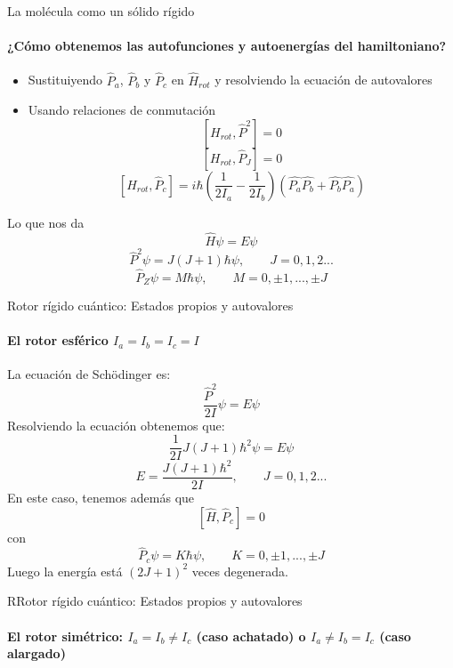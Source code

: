 \documentclass[a4paper]{beamer}
\begin{document}
\begin{frame}{La molécula como un sólido rígido}
\framesubtitle{¿Cómo obtenemos las autofunciones y autoenergías del hamiltoniano?}
\begin{itemize}
\item	Sustituiyendo $\hat P_a$, $\hat P_b$ y $\hat P_c$ en $\hat H_{rot}$ y resolviendo la ecuación de autovalores 
\item Usando relaciones de conmutación 
\begin{equation*}
\left[H_{rot}, \hat P^2 \right] = 0
\end{equation*}
\begin{equation*}
\left[H_{rot}, \hat P_J \right] = 0
\end{equation*}
\begin{equation*}
\left[H_{rot}, \hat P_c \right] = i\hbar \left(\frac{1}{2I_a}-\frac{1}{2I_b}\right)\left(\hat{P_a}\hat{P_b}+\hat{P_b}\hat{P_a}\right)
\end{equation*}
\end{itemize}
Lo que nos da 
\begin{equation}
\hat H\psi = E\psi
\end{equation}
\begin{equation}
\hat P^2\psi = J(J+1)\hbar \psi, \qquad J=0,1,2...
\end{equation}
\begin{equation}
\hat P_Z\psi = M\hbar\psi, \qquad M = 0,\pm 1,...,\pm J
\end{equation}
\end{frame}

\begin{frame}{Rotor rígido cuántico: Estados propios y autovalores}
\framesubtitle{El rotor esférico $I_a=I_b=I_c= I$}
La ecuación de Schödinger es:
\begin{equation*}
\frac{\hat P^2}{2I} \psi = E\psi
\end{equation*}
Resolviendo la ecuación obtenemos que:$$\frac{1}{2I}J(J+1)\hbar^2\psi=E\psi$$
\begin{equation}
E=\frac{J(J+1)\hbar^2}{2I}, \qquad J=0,1,2...
\end{equation}
En este caso, tenemos además que
\begin{equation}
\left[\hat H,\hat P_c \right]=0
\end{equation}
con $$\hat P_c \psi = K\hbar\psi, \qquad K = 0, \pm 1,..., \pm J$$
Luego la energía está $(2J+1)^2$ veces degenerada.
\end{frame}

\begin{frame}{RRotor rígido cuántico: Estados propios y autovalores}
\framesubtitle {El rotor simétrico: $I_a=I_b\neq I_c$ (caso achatado) o $I_a\neq I_b=I_c$ (caso alargado)}
\end{frame}
\end{document}
